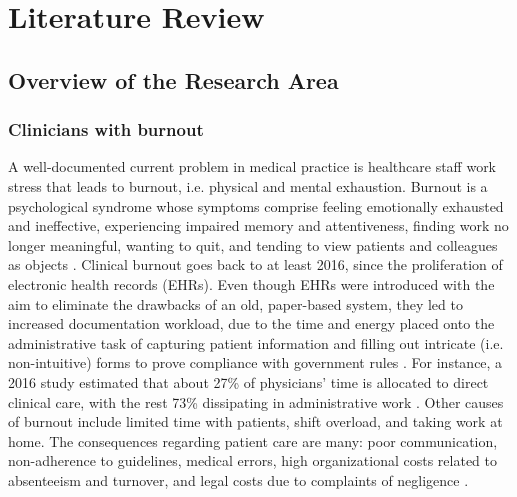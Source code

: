 
\chapter{Literature Review}\label{chap:lit-review}

\ifpdf
    \graphicspath{{Chapter2/Figs/Raster/}{Chapter2/Figs/PDF/}{Chapter2/Figs/}}
\else
    \graphicspath{{Chapter2/Figs/Vector/}{Chapter2/Figs/}}
\fi

\section{Overview of the Research Area}

\subsection{Clinicians with burnout}\label{Clinicians with burnout}
A well-documented current problem in medical practice is healthcare staff work stress that leads to burnout, i.e. physical and mental exhaustion. Burnout is a psychological syndrome whose symptoms comprise feeling emotionally exhausted and ineffective, experiencing impaired memory and attentiveness, finding work no longer meaningful, wanting to quit, and tending to view patients and colleagues as objects \cite{physicianburnout2018}. Clinical burnout goes back to at least 2016, since the proliferation of electronic health records (EHRs). Even though EHRs were introduced with the aim to eliminate the drawbacks of an old, paper-based system, they led to increased documentation workload, due to the time and energy placed onto the administrative task of capturing patient information and filling out intricate (i.e. non-intuitive) forms to prove compliance with government rules \cite{nejm2016burnout, physicianburnout2018}. For instance, a 2016 study estimated that about 27\% of physicians' time is allocated to direct clinical care, with the rest 73\% dissipating in administrative work \cite{timeallocation2016}. Other causes of burnout include limited time with patients, shift overload, and taking work at home. The consequences regarding patient care are many: poor communication, non-adherence to guidelines, medical errors, high organizational costs related to absenteeism and turnover, and legal costs due to complaints of negligence \cite{burnoutcovid2021}.

